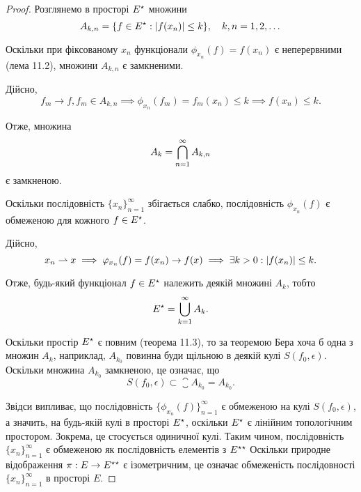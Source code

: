 \begin{proof}
Розглянемо в просторі $E^\star$ множини
\begin{equation*}
    A_{k,n} = \{f \in E^\star: |f(x_n)| \le k\}, \quad
    k, n = 1, 2, \dots
\end{equation*}

Оскільки при фіксованому $x_n$ функціонали $\phi_{x_n}(f) = f(x_n)$ є
неперервними (лема 11.2), множини $A_{k,n}$ є замкненими.

Дійсно,
\begin{equation*}
    f_m \to f, f_m \in A_{k,n} \implies
    \phi_{x_n}(f_m) = f_m(x_n) \le k \implies
    f(x_n) \le k.
\end{equation*}

Отже, множина
\begin{equation*}
    A_k = \operatorname*{\bigcap}_{n = 1}^\infty A_{k,n}
\end{equation*}
є замкненою.

Оскільки послідовність $\{x_n\}_{n = 1}^\infty$
збігається слабко, послідовність $\phi_{x_n}(f)$ є обмеженою для кожного
$f \in E^\star$.

Дійсно,
\begin{equation*}
    x_n \rightharpoonup x \implies
    \varphi_{x_n}(f) = f(x_n) \to f(x) \implies
    \exists k > 0: |f(x_n)| \le k.
\end{equation*}

Отже, будь-який функціонал $f \in E^\star$ належить деякій
множині $A_k$, тобто
\begin{equation*}
    E^\star = \operatorname*{\bigcup}_{k = 1}^\infty A_k.
\end{equation*}

Оскільки простір $E^\star$ є повним (теорема 11.3), то за теоремою
Бера хоча б одна з множин $A_k$, наприклад,
$A_{k_0}$ повинна буди
щільною в деякій кулі $S(f_0, \epsilon)$. Оскільки множина $A_{k_0}$
замкненою, це означає, що
\begin{equation*}
    S(f_0, \epsilon) \subset \closure A_{k_0} = A_{k_0}.
\end{equation*}

Звідси випливає, що послідовність $\{\phi_{x_n}(f)\}_{n = 1}^\infty$
є обмеженою на кулі $S(f_0, \epsilon)$, а значить, на будь-якій кулі в просторі $E^\star$,
оскільки $E^\star$ є лінійним топологічним простором. Зокрема, це
стосується одиничної кулі. Таким чином, послідовність
$\{x_n\}_{n = 1}^\infty$
є обмеженою як послідовність елементів з $E^{\star\star}$
Оскільки природне відображення $\pi: E \to E^{\star\star}$ є ізометричним,
це означає обмеженість послідовності $\{x_n\}_{n = 1}^\infty$ в просторі $E$.
\end{proof}

